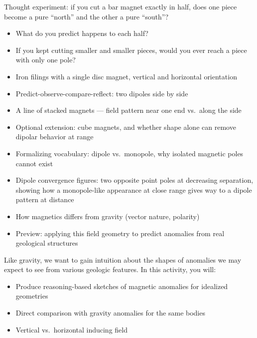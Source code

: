 
Thought experiment: if you cut a bar magnet exactly in half, does one piece become a pure ``north'' and the other a pure ``south''?

\begin{itemize}
    \item What do you predict happens to each half?
    \item If you kept cutting smaller and smaller pieces, would you ever reach a piece with only one pole?
\end{itemize}


\begin{itemize}
  \item Iron filings with a single disc magnet, vertical and horizontal orientation
  \item Predict-observe-compare-reflect: two dipoles side by side
  \item A line of stacked magnets --- field pattern near one end vs.\ along the side
  \item Optional extension: cube magnets, and whether shape alone can remove dipolar behavior at range
\end{itemize}

\begin{itemize}
  \item Formalizing vocabulary: dipole vs.\ monopole, why isolated magnetic poles cannot exist
  \item Dipole convergence figures: two opposite point poles at decreasing separation, showing how a monopole-like appearance at close range gives way to a dipole pattern at distance
  \item How magnetics differs from gravity (vector nature, polarity)
  \item Preview: applying this field geometry to predict anomalies from real geological structures
\end{itemize}


Like gravity, we want to gain intuition about the shapes of anomalies we may expect to see from various geologic features. In this activity, you will:
\begin{itemize}
  \item Produce reasoning-based sketches of magnetic anomalies for idealized geometries
  \item Direct comparison with gravity anomalies for the same bodies
  \item Vertical vs.\ horizontal inducing field
\end{itemize}


